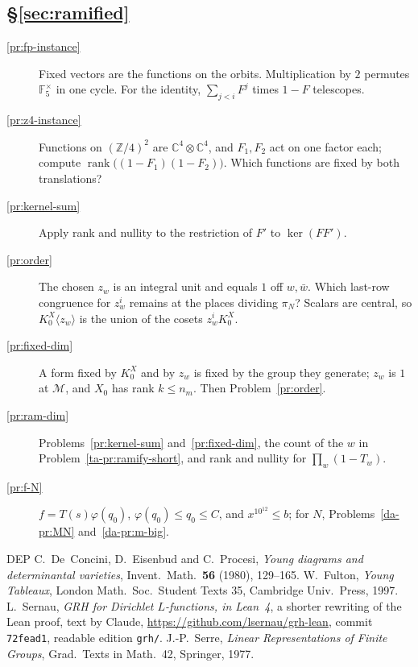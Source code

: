 \documentclass[reqno]{amsart}
\theoremstyle{definition}
\theoremstyle{plain}
\theoremstyle{definition}
\newcommand{\Z}{\mathbb{Z}}
\newcommand{\C}{\mathbb{C}}
\newcommand{\F}{\mathbb{F}}
\begin{document}
\subsection*{\S\ref{sec:ramified}}
\begin{description}
\item[\ref{pr:fp-instance}] Fixed vectors are the functions on the orbits.  Multiplication by \(2\) permutes \(\F_5^\times\) in one cycle.  For the identity, \(\sum_{j<i}F^j\) times \(1 - F\) telescopes.
\item[\ref{pr:z4-instance}] Functions on \((\Z/4)^2\) are \(\C^4 \otimes \C^4\), and \(F_1, F_2\) act on one factor each; compute \(\operatorname{rank}\bigl((1 - F_1)(1 - F_2)\bigr)\).  Which functions are fixed by both translations?
\item[\ref{pr:kernel-sum}] Apply rank and nullity to the restriction of \(F'\) to \(\ker(FF')\).
\item[\ref{pr:order}] The chosen \(z_w\) is an integral unit and equals \(1\) off \(w, \bar w\).  Which last-row congruence for \(z_w^i\) remains at the places dividing \(\pi_N\)?  Scalars are central, so \(K^X_0\langle z_w\rangle\) is the union of the cosets \(z_w^iK^X_0\).
\item[\ref{pr:fixed-dim}] A form fixed by \(K^X_0\) and by \(z_w\) is fixed by the group they generate; \(z_w\) is \(1\) at \(\mathcal M\), and \(X_0\) has rank \(k \le n_m\).  Then Problem~\ref{pr:order}.
\item[\ref{pr:ram-dim}] Problems~\ref{pr:kernel-sum} and~\ref{pr:fixed-dim}, the count of the \(w\) in Problem~\ref{ta-pr:ramify-short}, and rank and nullity for \(\prod_w(1 - T_w)\).
\item[\ref{pr:f-N}] \(f = T(s)\varphi(q_0)\), \(\varphi(q_0) \le q_0 \le C\), and \(x^{10^{12}} \le b\); for \(N\), Problems~\ref{da-pr:MN} and~\ref{da-pr:m-big}.
\end{description}

\begin{thebibliography}{DEP}
 C.~De~Concini, D.~Eisenbud and C.~Procesi, \emph{Young diagrams and determinantal varieties}, Invent.\ Math.\ \textbf{56} (1980), 129--165.
 W.~Fulton, \emph{Young Tableaux}, London Math.\ Soc.\ Student Texts 35, Cambridge Univ.\ Press, 1997.
 L.~Sernau, \emph{GRH for Dirichlet \(L\)-functions, in Lean~4}, a shorter rewriting of the Lean proof, text by Claude, \url{https://github.com/lsernau/grh-lean}, commit \texttt{72fead1}, readable edition \texttt{grh/}.
 J.-P.~Serre, \emph{Linear Representations of Finite Groups}, Grad.\ Texts in Math.\ 42, Springer, 1977.
\end{thebibliography}
\end{document}
